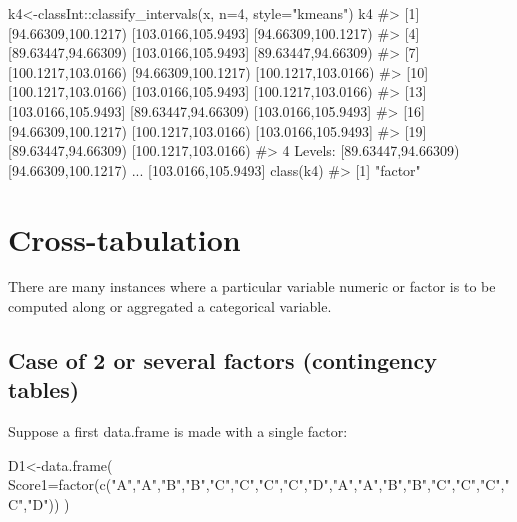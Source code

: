 \documentclass[
  letterpaper,
  DIV=11,
  numbers=noendperiod]{scrreprt}
\newenvironment{Shaded}{\begin{snugshade}}{\end{snugshade}}
\newcommand{\AttributeTok}[1]{\textcolor[rgb]{0.40,0.45,0.13}{#1}}
\newcommand{\CommentTok}[1]{\textcolor[rgb]{0.37,0.37,0.37}{#1}}
\newcommand{\DecValTok}[1]{\textcolor[rgb]{0.68,0.00,0.00}{#1}}
\newcommand{\FunctionTok}[1]{\textcolor[rgb]{0.28,0.35,0.67}{#1}}
\newcommand{\NormalTok}[1]{\textcolor[rgb]{0.00,0.23,0.31}{#1}}
\newcommand{\OtherTok}[1]{\textcolor[rgb]{0.00,0.23,0.31}{#1}}
\newcommand{\SpecialCharTok}[1]{\textcolor[rgb]{0.37,0.37,0.37}{#1}}
\newcommand{\StringTok}[1]{\textcolor[rgb]{0.13,0.47,0.30}{#1}}
\begin{document}
\begin{Shaded}
\begin{Highlighting}[]
\NormalTok{k4}\OtherTok{\textless{}{-}}\NormalTok{classInt}\SpecialCharTok{::}\FunctionTok{classify\_intervals}\NormalTok{(x, }\AttributeTok{n=}\DecValTok{4}\NormalTok{, }\AttributeTok{style=}\StringTok{"kmeans"}\NormalTok{)}
\NormalTok{k4}
\CommentTok{\#\textgreater{}  [1] [94.66309,100.1217) [103.0166,105.9493] [94.66309,100.1217)}
\CommentTok{\#\textgreater{}  [4] [89.63447,94.66309) [103.0166,105.9493] [89.63447,94.66309)}
\CommentTok{\#\textgreater{}  [7] [100.1217,103.0166) [94.66309,100.1217) [100.1217,103.0166)}
\CommentTok{\#\textgreater{} [10] [100.1217,103.0166) [103.0166,105.9493] [100.1217,103.0166)}
\CommentTok{\#\textgreater{} [13] [103.0166,105.9493] [89.63447,94.66309) [103.0166,105.9493]}
\CommentTok{\#\textgreater{} [16] [94.66309,100.1217) [100.1217,103.0166) [103.0166,105.9493]}
\CommentTok{\#\textgreater{} [19] [89.63447,94.66309) [100.1217,103.0166)}
\CommentTok{\#\textgreater{} 4 Levels: [89.63447,94.66309) [94.66309,100.1217) ... [103.0166,105.9493]}
\FunctionTok{class}\NormalTok{(k4)}
\CommentTok{\#\textgreater{} [1] "factor"}
\end{Highlighting}
\end{Shaded}

\chapter{Cross-tabulation}\label{sec-cross-tabulation}

There are many instances where a particular variable numeric or factor
is to be computed along or aggregated a categorical variable.

\section{Case of 2 or several factors (contingency
tables)}\label{case-of-2-or-several-factors-contingency-tables}

Suppose a first data.frame is made with a single factor:

\begin{Shaded}
\begin{Highlighting}[]
\NormalTok{D1}\OtherTok{\textless{}{-}}\FunctionTok{data.frame}\NormalTok{(}
\AttributeTok{Score1=}\FunctionTok{factor}\NormalTok{(}\FunctionTok{c}\NormalTok{(}\StringTok{"A"}\NormalTok{,}\StringTok{"A"}\NormalTok{,}\StringTok{"B"}\NormalTok{,}\StringTok{"B"}\NormalTok{,}\StringTok{"C"}\NormalTok{,}\StringTok{"C"}\NormalTok{,}\StringTok{"C"}\NormalTok{,}\StringTok{"C"}\NormalTok{,}\StringTok{"D"}\NormalTok{,}\StringTok{"A"}\NormalTok{,}\StringTok{"A"}\NormalTok{,}\StringTok{"B"}\NormalTok{,}\StringTok{"B"}\NormalTok{,}\StringTok{"C"}\NormalTok{,}\StringTok{"C"}\NormalTok{,}\StringTok{"C"}\NormalTok{,}\StringTok{"C"}\NormalTok{,}\StringTok{"D"}\NormalTok{))}
\NormalTok{)}
\end{Highlighting}
\end{Shaded}
\end{document}
